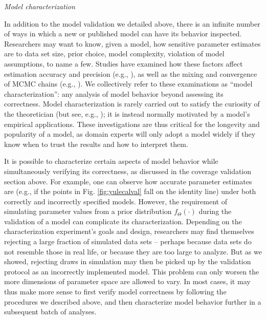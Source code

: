 \documentclass[oneside]{article}
\begin{document}


\vspace{.25cm}

\noindent \emph{Model characterization}

In addition to the model validation we detailed above, there is an infinite number of ways in which a new or published model can have its behavior inspected.
Researchers may want to know, given a model, how sensitive parameter estimates are to data set size, prior choice, model complexity, violation of model assumptions, to name a few.
Studies have examined how these factors affect estimation accuracy and precision (e.g., \citealp{zhang23,luo23}), as well as the mixing and convergence of MCMC chains (e.g., \citealp{nylander04,zhang23}).
We collectively refer to these examinations as ``model characterization'': any analysis of model behavior beyond assessing its correctness.
Model characterization is rarely carried out to satisfy the curiosity of the theoretician (but see, e.g., \citealp{tuffley97,steel20}); it is instead normally motivated by a model's empirical applications.
These investigations are thus critical for the longevity and popularity of a model, as domain experts will only adopt a model widely if they know when to trust the results and how to interpret them.

It is possible to characterize certain aspects of model behavior while simultaneously verifying its correctness, as discussed in the coverage validation section above.
For example, one can observe how accurate parameter estimates are (e.g., if the points in Fig. \ref{fig:yulecalval} fall on the identity line) under both correctly and incorrectly specified models.
However, the requirement of simulating parameter values from a prior distribution $f_{\Theta}(\cdot)$ during the validation of a model can complicate its characterization.
Depending on the characterization experiment's goals and design, researchers may find themselves rejecting a large fraction of simulated data sets -- perhaps because data sets do not resemble those in real life, or because they are too large to analyze.
But as we showed, rejecting draws in simulation may then be picked up by the validation protocol as an incorrectly implemented model.
This problem can only worsen the more dimensions of parameter space are allowed to vary.
In most cases, it may thus make more sense to first verify model correctness by following the procedures we described above, and then characterize model behavior further in a subsequent batch of analyses.
\end{document}
